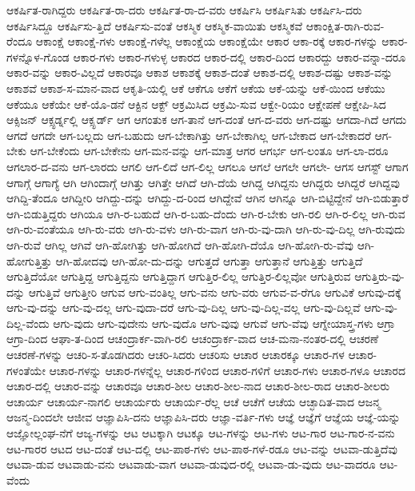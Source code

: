 {ಆಕರ್ಷಿತ-ರಾಗಿದ್ದರು
ಆಕರ್ಷಿತ-ರಾ-ದರು
ಆಕರ್ಷಿತ-ರಾ-ದ-ವರು
ಆಕರ್ಷಿಸಿ
ಆಕರ್ಷಿಸಿತು
ಆಕರ್ಷಿಸಿ-ದರು
ಆಕರ್ಷಿಸಿದ್ದೂ
ಆಕರ್ಷಿಸು-ತ್ತಿದೆ
ಆಕರ್ಷಿಸು-ವಂತೆ
ಆಕಸ್ಮಿಕ
ಆಕಸ್ಮಿಕ-ವಾಯಿತು
ಆಕಸ್ಮಿಕವೆ
ಆಕಾಂಕ್ಷಿತ-ರಾಗಿ-ರುವ-ರೆಂದೂ
ಆಕಾಂಕ್ಷೆ
ಆಕಾಂಕ್ಷೆ-ಗಳು
ಆಕಾಂಕ್ಷೆ-ಗಳೆಲ್ಲ
ಆಕಾಂಕ್ಷೆಯ
ಆಕಾಂಕ್ಷೆಯೇ
ಆಕಾರ
ಆಕಾ-ರಕ್ಕೆ
ಆಕಾರ-ಗಳನ್ನು
ಆಕಾರ-ಗಳನ್ನೊಳ-ಗೊಂಡ
ಆಕಾರ-ಗಳು
ಆಕಾರ-ಗಳುಳ್ಳ
ಆಕಾರದ
ಆಕಾರ-ದಲ್ಲಿ
ಆಕಾರ-ದಿಂದ
ಆಕಾರದ್ದು
ಆಕಾರ-ವನ್ನಾ-ದರೂ
ಆಕಾರ-ವನ್ನು
ಆಕಾರ-ವಿಲ್ಲದೆ
ಆಕಾರವೂ
ಆಕಾಶ
ಆಕಾಶಕ್ಕೆ
ಆಕಾಶ-ದಂತೆ
ಆಕಾಶ-ದಲ್ಲಿ
ಆಕಾಶ-ದಷ್ಟು
ಆಕಾಶ-ವನ್ನು
ಆಕಾಶವೆ
ಆಕಾಶ-ಸ-ಮಾನ-ವಾದ
ಆಕೃತಿ-ಯಲ್ಲಿ
ಆಕೆ
ಆಕೆಗೂ
ಆಕೆಗೆ
ಆಕೆಯ
ಆಕೆ-ಯನ್ನು
ಆಕೆ-ಯಿಂದ
ಆಕೆಯು
ಆಕೆಯೂ
ಆಕೆಯೇ
ಆಕೆ-ಯೊ-ಡನೆ
ಆಕ್ಟಿನ
ಆಕ್ಟ್
ಆಕ್ರಮಿಸಿದ
ಆಕ್ರಮಿ-ಸುವ
ಆಕ್ವೇ-ರಿಯಂ
ಆಕ್ಷೇಪಣೆ
ಆಕ್ಷೇಪಿ-ಸಿದ
ಆಕ್ಸಿಜನ್
ಆಕ್ಸ್ಫರ್ಡ್ನಲ್ಲಿ
ಆಕ್ಸ್ಫರ್ಡ್
ಆಗ
ಆಗಂತುಕ
ಆಗ-ತಾನೆ
ಆಗ-ದಂತೆ
ಆಗ-ದ-ವರು
ಆಗ-ದಷ್ಟು
ಆಗದಾ-ಗಿದೆ
ಆಗದು
ಆಗದೆ
ಆಗದೇ
ಆಗ-ಬಲ್ಲದು
ಆಗ-ಬಹುದು
ಆಗ-ಬೇಕಾಗಿತ್ತು
ಆಗ-ಬೇಕಾಗಿಲ್ಲ
ಆಗ-ಬೇಕಾದ
ಆಗ-ಬೇಕಾದರೆ
ಆಗ-ಬೇಕು
ಆಗ-ಬೇಕೆಂದು
ಆಗ-ಬೇಕೇನು
ಆಗ-ಮನ-ವನ್ನು
ಆಗ-ಮಾತ್ರ
ಆಗರ
ಆಗರ್ಭ
ಆಗ-ಲಂತೂ
ಆಗ-ಲಾ-ದರೂ
ಆಗಲಾರ-ದ-ವನು
ಆಗ-ಲಾರದು
ಆಗಲಿ
ಆಗ-ಲಿದೆ
ಆಗ-ಲಿಲ್ಲ
ಆಗಲೂ
ಆಗಲೆ
ಆಗಲೇ
ಆಗಲೇ-
ಆಗಸ
ಆಗಸ್ಟ್
ಆಗಾಗ
ಆಗಾಗ್ಗೆ
ಆಗಾಗ್ಯೆ
ಆಗಿ
ಆಗಿಂದಾಗ್ಗೆ
ಆಗಿತ್ತು
ಆಗಿತ್ತೇ
ಆಗಿದೆ
ಆಗಿ-ದೆಯೆ
ಆಗಿದ್ದ
ಆಗಿದ್ದನು
ಆಗಿದ್ದರು
ಆಗಿದ್ದರೆ
ಆಗಿದ್ದವು
ಆಗಿದ್ದಿ-ತೆಂದೂ
ಆಗಿದ್ದೀರಿ
ಆಗಿದ್ದು-ದನ್ನು
ಆಗಿದ್ದು-ದ-ರಿಂದ
ಆಗಿದ್ದೇವೆ
ಆಗಿನ
ಆಗಿನ್ನೂ
ಆಗಿ-ಬಿಟ್ಟಿದ್ದೇನೆ
ಆಗಿ-ಬಿಡುತ್ತಾರೆ
ಆಗಿ-ಬಿಡುತ್ತಿದ್ದರು
ಆಗಿಯೂ
ಆಗಿ-ರ-ಬಹುದೆ
ಆಗಿ-ರ-ಬಹು-ದೆಂದು
ಆಗಿ-ರ-ಬೇಕು
ಆಗಿ-ರಲಿ
ಆಗಿ-ರ-ಲಿಲ್ಲ
ಆಗಿ-ರುವ
ಆಗಿ-ರು-ವಂತೆಯೂ
ಆಗಿ-ರು-ವರು
ಆಗಿ-ರು-ವಳು
ಆಗಿ-ರು-ವಾಗ
ಆಗಿ-ರು-ವು-ದಾಗಿ
ಆಗಿ-ರು-ವು-ದಿಲ್ಲ
ಆಗಿ-ರುವುದು
ಆಗಿ-ರುವೆ
ಆಗಿಲ್ಲ
ಆಗಿವೆ
ಆಗಿ-ಹೋಗಿತ್ತು
ಆಗಿ-ಹೋಗಿದೆ
ಆಗಿ-ಹೋಗಿ-ದೆಯೊ
ಆಗಿ-ಹೋಗಿ-ರು-ವೆವು
ಆಗಿ-ಹೋಗುತ್ತಿತ್ತು
ಆಗಿ-ಹೋದವು
ಆಗಿ-ಹೋ-ದು-ದನ್ನು
ಆಗುತ್ತದೆ
ಆಗುತ್ತಾ
ಆಗುತ್ತಾನೆ
ಆಗುತ್ತಿತ್ತು
ಆಗುತ್ತಿದೆ
ಆಗುತ್ತಿದೆಯೋ
ಆಗುತ್ತಿದ್ದ
ಆಗುತ್ತಿದ್ದನು
ಆಗುತ್ತಿದ್ದಾಗ
ಆಗುತ್ತಿರ-ಲಿಲ್ಲ
ಆಗುತ್ತಿರ-ಲಿಲ್ಲವೋ
ಆಗುತ್ತಿರುವ
ಆಗುತ್ತಿರು-ವು-ದನ್ನು
ಆಗುತ್ತಿವೆ
ಆಗುತ್ತೀರಿ
ಆಗುವ
ಆಗು-ವಂತಿಲ್ಲ
ಆಗು-ವನು
ಆಗು-ವರು
ಆಗುವ-ವ-ರೆಗೂ
ಆಗುವಿಕೆ
ಆಗುವು-ದಕ್ಕೆ
ಆಗು-ವು-ದನ್ನು
ಆಗು-ವು-ದಲ್ಲ
ಆಗು-ವುದಾ-ದರೆ
ಆಗು-ವು-ದಿಲ್ಲ
ಆಗು-ವು-ದಿಲ್ಲ-ವಲ್ಲ
ಆಗು-ವು-ದಿಲ್ಲವೆ
ಆಗು-ವು-ದಿಲ್ಲ-ವೆಂದು
ಆಗು-ವುದು
ಆಗು-ವುದೇನು
ಆಗು-ವುದೊ
ಆಗು-ವುವು
ಆಗುವೆ
ಆಗು-ವೆವು
ಆಗ್ನೇಯಾಸ್ತ್ರ-ಗಳು
ಆಗ್ರಾ
ಆಗ್ರಾ-ದಿಂದ
ಆಘಾ-ತ-ದಿಂದ
ಆಚಂದ್ರಾರ್ಕ-ವಾಗಿ-ರಲಿ
ಆಚಂದ್ರಾರ್ಕ-ವಾದ
ಆಚ-ಮನಾ-ನಂತರ-ದಲ್ಲಿ
ಆಚರಣೆ
ಆಚರಣೆ-ಗಳನ್ನು
ಆಚರಿ-ಸ-ತೊಡಗಿದರು
ಆಚರಿ-ಸಿದರು
ಆಚರಿಸು
ಆಚಾರ
ಆಚಾರಕ್ಕೂ
ಆಚಾರ-ಗಳ
ಆಚಾರ-ಗಳಂತೆಯೇ
ಆಚಾರ-ಗಳನ್ನು
ಆಚಾರ-ಗಳನ್ನೆಲ್ಲ
ಆಚಾರ-ಗಳಿಂದ
ಆಚಾರ-ಗಳಿಗೆ
ಆಚಾರ-ಗಳು
ಆಚಾರ-ಗಳೂ
ಆಚಾರದ
ಆಚಾರ-ದಲ್ಲಿ
ಆಚಾರ-ವನ್ನು
ಆಚಾರವೂ
ಆಚಾರ-ಶೀಲ
ಆಚಾರ-ಶೀಲ-ನಾದ
ಆಚಾರ-ಶೀಲ-ರಾದ
ಆಚಾರ-ಶೀಲರು
ಆಚಾರ್ಯ
ಆಚಾರ್ಯ-ನಾಗಲಿ
ಆಚಾರ್ಯರು
ಆಚಾರ್ಯ-ರೆಲ್ಲ
ಆಚೆ
ಆಚೆಗೆ
ಆಚೆಯ
ಆಚ್ಛಾದಿತ-ವಾದ
ಆಜನ್ಮ
ಆಜನ್ಮ-ದಿಂದಲೇ
ಆಜೀವ
ಆಜ್ಞಾಪಿಸಿ-ದನು
ಆಜ್ಞಾಪಿಸಿ-ದರು
ಆಜ್ಞಾ-ವರ್ತಿ-ಗಳು
ಆಜ್ಞೆ
ಆಜ್ಞೆಗೆ
ಆಜ್ಞೆಯ
ಆಜ್ಞೆ-ಯನ್ನು
ಆಜ್ಞೋಲ್ಲಂಘ-ನೆಗೆ
ಆಜ್ಯ-ಗಳನ್ನು
ಆಟ
ಆಟಕ್ಕಾಗಿ
ಆಟಕ್ಕೂ
ಆಟ-ಗಳನ್ನು
ಆಟ-ಗಳು
ಆಟ-ಗಾರ
ಆಟ-ಗಾರ-ನ-ವನು
ಆಟ-ಗಾರರ
ಆಟದ
ಆಟ-ದಂತೆ
ಆಟ-ದಲ್ಲಿ
ಆಟ-ಪಾಠ-ಗಳು
ಆಟ-ಪಾಠ-ಗಳೆ-ರಡೂ
ಆಟ-ವನ್ನು
ಆಟವಾ-ಡುತ್ತಿದೆವು
ಆಟವಾ-ಡುವ
ಆಟವಾಡು-ವನು
ಆಟವಾಡು-ವಾಗ
ಆಟವಾ-ಡುವುದ-ರಲ್ಲಿ
ಆಟವಾ-ಡು-ವುದು
ಆಟ-ವಾದರೂ
ಆಟ-ವೆಂದು
}
